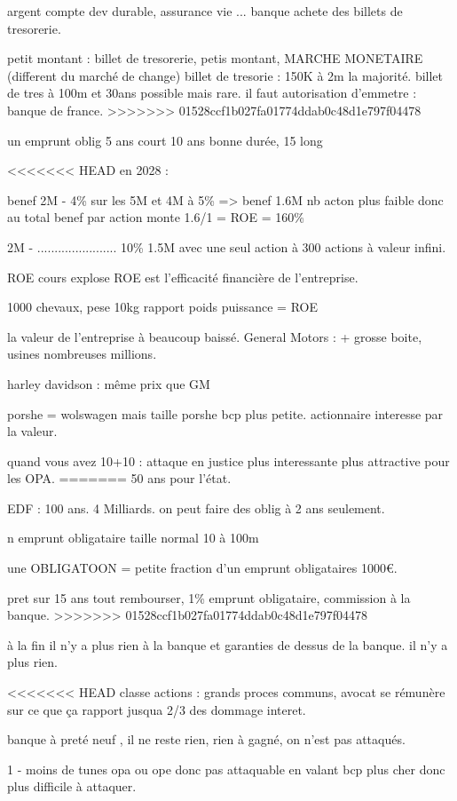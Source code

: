 \documentclass[a4paper,12pt]{article}
\begin{document}
argent compte dev durable, assurance vie ... banque achete des billets de tresorerie.

petit montant : billet de tresorerie, petis montant,  MARCHE MONETAIRE  (different du marché de change)
billet de tresorie : 150K à 2m la majorité.
billet de tres à 100m et 30ans possible mais rare.
il faut autorisation d'emmetre : banque de france.
>>>>>>> 01528ccf1b027fa01774ddab0c48d1e797f04478

un emprunt oblig 5 ans court
10 ans bonne durée, 15 long

<<<<<<< HEAD
en 2028 : 

benef 2M - 4\% sur les 5M et 4M à 5\%  => benef 1.6M nb acton plus faible donc au total
benef par action monte  
1.6/1 = ROE = 160\%
   
2M - ....................... 10\%     1.5M avec une seul action à 300 actions à valeur infini.

ROE   cours explose
ROE est l'efficacité financière de l'entreprise.

1000 chevaux, pese 10kg    rapport poids puissance = ROE

la valeur de l'entreprise à beaucoup baissé.
General Motors : + grosse boite, usines nombreuses millions.

harley davidson : même prix que GM

porshe = wolswagen mais taille porshe bcp plus petite.
actionnaire interesse par la valeur.

quand vous avez 10+10 :
attaque en justice plus interessante
plus attractive pour les OPA.
=======
50 ans pour l'état.

EDF : 100 ans. 4 Milliards.
on peut faire des oblig à 2 ans seulement.

n emprunt obligataire taille normal 10 à 100m

une OBLIGATOON = petite fraction d'un emprunt obligataires  1000€.

pret sur 15 ans tout rembourser, 1\% emprunt obligataire, commission à la banque.
>>>>>>> 01528ccf1b027fa01774ddab0c48d1e797f04478

à la fin il n'y a plus rien à la banque et garanties de dessus de la banque.
il n'y a plus rien.

<<<<<<< HEAD
classe actions : grands proces communs, avocat se rémunère sur ce que ça rapport jusqua 2/3 des dommage interet.

banque à preté neuf , il ne reste rien, rien à gagné, on n'est pas attaqués.

1 - moins de tunes opa ou ope donc pas attaquable en valant bcp plus cher donc plus difficile à attaquer.
\end{document}
